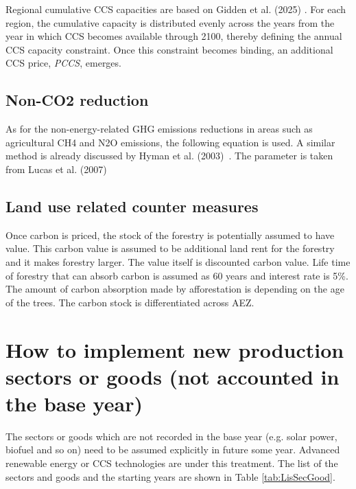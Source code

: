 \documentclass[10pt,a4paper,titlepage,dvipdfmx]{book}
\newif\ifAIMHubReviewMode
\newenvironment{changedblock}{\begingroup\ifAIMHubReviewMode\color{red}\fi}{\endgroup}
\begin{document}
\begin{changedblock}
Regional cumulative CCS capacities are based on Gidden et al. (2025) \cite{Gidden2025}. For each region, the cumulative capacity is distributed evenly across the years from the year in which CCS becomes available through 2100, thereby defining the annual CCS capacity constraint. Once this constraint becomes binding, an additional CCS price, \textit{PCCS}, emerges.
\end{changedblock}

\subsection{\label{subsec:NonCO2Red}{Non-CO2 reduction}}

As for the non-energy-related GHG emissions reductions in areas such as agricultural CH4 and N2O emissions, the following equation is used. A similar method is already discussed by Hyman et al. (2003)~\cite{RN2134}. The parameter is taken from Lucas et al. (2007)~\cite{RN2282}

\subsection{\label{subsec:LanUseRelCouMea}Land use related counter measures}

Once carbon is priced, the stock of the forestry is potentially assumed to have value. This carbon value is assumed to be additional land rent for the forestry and it makes forestry larger. The value itself is discounted carbon value. Life time of forestry that can absorb carbon is assumed as 60 years and interest rate is 5\%. The amount of carbon absorption made by afforestation is depending on the age of the trees. The carbon stock is differentiated across AEZ.

\section{\label{sec:HowImpNewProSec}How to implement new production sectors or goods (not accounted in the base year) }

The sectors or goods which are not recorded in the base year (e.g. solar power, biofuel and so on) need to be assumed explicitly in future some year. Advanced renewable energy or CCS technologies are under this treatment. The list of the sectors and goods and the starting years are shown in Table \ref{tab:LisSecGood}.
\end{document}
